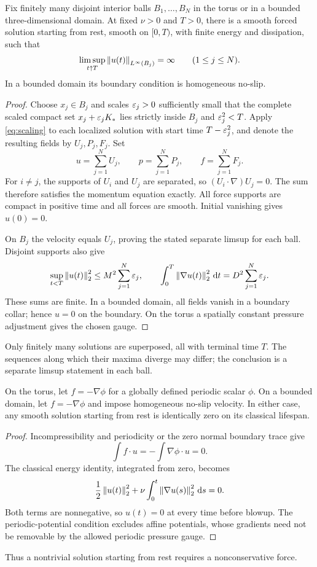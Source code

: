 \begin{proposition}\label{prop:multiple}
Fix finitely many disjoint interior balls $B_1,\ldots,B_N$ in the torus or in a bounded three-dimensional domain. At fixed $\nu>0$ and $T>0$, there is a smooth forced solution starting from rest, smooth on $[0,T)$, with finite energy and dissipation, such that
\[
 \limsup_{t\uparrow T}\left\lVert u(t)\right\rVert_{L^\infty(B_j)}=\infty
 \qquad(1\le j\le N).
\]
In a bounded domain its boundary condition is homogeneous no-slip.
\end{proposition}
\begin{proof}
Choose $x_j\in B_j$ and scales $\varepsilon_j>0$ sufficiently small that the complete scaled compact set $x_j+\varepsilon_jK_*$ lies strictly inside $B_j$ and $\varepsilon_j^2<T$. Apply \eqref{eq:scaling} to each localized solution with start time $T-\varepsilon_j^2$, and denote the resulting fields by $U_j,P_j,F_j$.
Set
\[
 u=\sum_{j=1}^N U_j,\qquad p=\sum_{j=1}^N P_j,\qquad f=\sum_{j=1}^N F_j.
\]
For $i\ne j$, the supports of $U_i$ and $U_j$ are separated, so
$(U_i\cdot\nabla)U_j=0$. The sum therefore satisfies the momentum equation exactly. All force supports are compact in positive time and all forces are smooth. Initial vanishing gives $u(0)=0$.

On $B_j$ the velocity equals $U_j$, proving the stated separate limsup for each ball. Disjoint supports also give
\[
 \sup_{t<T}\left\lVert u(t)\right\rVert_2^2\le M^2\sum_{j=1}^N\varepsilon_j,\qquad
 \int_0^T\left\lVert\nabla u(t)\right\rVert_2^2\,\mathrm d t=D^2\sum_{j=1}^N\varepsilon_j.
\]
These sums are finite. In a bounded domain, all fields vanish in a boundary collar; hence $u=0$ on the boundary. On the torus a spatially constant pressure adjustment gives the chosen gauge.
\end{proof}
Only finitely many solutions are superposed, all with terminal time $T$. The sequences along which their maxima diverge may differ; the conclusion is a separate limsup statement in each ball.

\begin{proposition}\label{prop:conservative}
On the torus, let $f=-\nabla\phi$ for a globally defined periodic scalar
$\phi$. On a bounded domain, let $f=-\nabla\phi$ and impose homogeneous no-slip velocity. In either case, any smooth solution starting from rest is identically zero on its classical lifespan.
\end{proposition}
\begin{proof}
Incompressibility and periodicity or the zero normal boundary trace give
\[
 \int f\cdot u
 =-\int\nabla\phi\cdot u=0.
\]
The classical energy identity, integrated from zero, becomes
\[
 \frac12\left\lVert u(t)\right\rVert_2^2
 +\nu\int_0^t\left\lVert\nabla u(s)\right\rVert_2^2\,\mathrm d s=0.
\]
Both terms are nonnegative, so $u(t)=0$ at every time before blowup.
The periodic-potential condition excludes affine potentials, whose gradients need not be removable by the allowed periodic pressure gauge.
\end{proof}

Thus a nontrivial solution starting from rest requires a nonconservative force.
